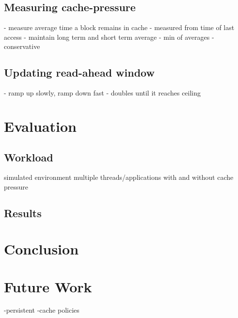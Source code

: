 \documentclass[twocolumn,10pt]{article}
\begin{document}
\subsection{Measuring cache-pressure}
	- measure average time a block remains in cache
		- measured from time of last access
	- maintain long term and short term average
	- min of averages - conservative

\subsection{Updating read-ahead window}
	- ramp up slowly, ramp down fast
	- doubles until it reaches ceiling

\section{Evaluation}

\subsection{Workload}
	simulated environment
	multiple threads/applications
	with and without cache pressure

\subsection{Results}

\section{Conclusion}

\section{Future Work}
	-persistent
	-cache policies
\end{document}
